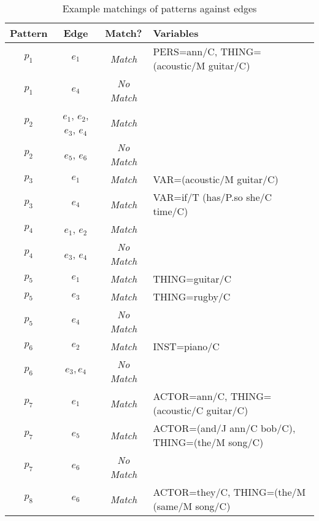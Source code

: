 \documentclass[11pt]{scrreprt}
\begin{document}
\begin{table}[ht]
\centering
\begin{tabular}{cccl}
\toprule
\textbf{Pattern} & \textbf{Edge} & \textbf{Match?} & \textbf{Variables} \\
\midrule
\(p_1\) & \(e_1\) & \textit{Match} & \textsf{PERS=ann/C, THING=(acoustic/M guitar/C)} \\
\(p_1\) & \(e_4\) & \textit{No Match} & \\
\(p_2\) & \(e_1\), \(e_2\), \(e_3\), \(e_4\) & \textit{Match} & \\
\(p_2\) & \(e_5\), \(e_6\) & \textit{No Match} & \\
\(p_3\) & \(e_1\) & \textit{Match} & \textsf{VAR=(acoustic/M guitar/C)} \\
\(p_3\) & \(e_4\) & \textit{Match} & \textsf{VAR=if/T (has/P.so she/C time/C)} \\
\(p_4\) & \(e_1\), \(e_2\) & \textit{Match} & \\
\(p_4\) & \(e_3\), \(e_4\)  & \textit{No Match} & \\
\(p_5\) & \(e_1\)  & \textit{Match} & \textsf{THING=guitar/C} \\
\(p_5\) & \(e_3\)  & \textit{Match} & \textsf{THING=rugby/C} \\
\(p_5\) & \(e_4\)  & \textit{No Match} & \\
\(p_6\) & \(e_2\)  & \textit{Match} & \textsf{INST=piano/C} \\
\(p_6\) & \(e_3, e_4\)  & \textit{No Match} & \\
\(p_7\) & \(e_1\)  & \textit{Match} & \textsf{ACTOR=ann/C, THING=(acoustic/C guitar/C)}\\
\(p_7\) & \(e_5\)  & \textit{Match} & \textsf{ACTOR=(and/J ann/C bob/C), THING=(the/M song/C)}\\
\(p_7\) & \(e_6\)  & \textit{No Match} & \\
\(p_8\) & \(e_6\)  & \textit{Match} & \textsf{ACTOR=they/C, THING=(the/M (same/M song/C)}\\
\bottomrule
\end{tabular}
\caption{Example matchings of patterns against edges}
\label{tab:shpl-example-matchings}
\end{table}
\end{document}
